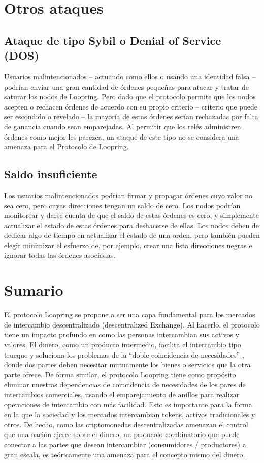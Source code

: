 \documentclass[UTF8,nofonts]{article}
\begin{document}
\begin{multicols}{2}
\section{Otros ataques}
\subsection{Ataque de tipo Sybil o Denial of Service (DOS)}
Usuarios malintencionados -- actuando como ellos o usando una identidad falsa -- podr\'ian enviar una gran cantidad de \'ordenes peque\~nas para atacar y tratar de saturar los nodos de Loopring. Pero dado que el protocolo permite que los nodos acepten o rechacen \'ordenes de acuerdo con su propio criterio -- criterio que puede ser escondido o revelado -- la mayor\'ia de estas \'ordenes ser\'ian rechazadas por falta de ganancia cuando sean emparejadas. Al permitir que los rel\'es administren \'ordenes como mejor les parezca, un ataque de este tipo no se considera una amenaza para el Protocolo de Loopring.

\subsection{Saldo insuficiente}
Los usuarios malintencionados podr\'ian firmar y propagar \'ordenes cuyo valor no sea cero, pero cuyas direcciones tengan un saldo de cero. Los nodos podr\'ian monitorear y darse cuenta de que el saldo de estas \'ordenes es cero, y simplemente actualizar el estado de estas \'ordenes para deshacerse de ellas. Los nodos deben de dedicar algo de tiempo en actualizar el estado de una orden, pero tambi\'en pueden elegir minimizar el esfuerzo de, por ejemplo, crear una lista direcciones negras e ignorar todas las \'ordenes asociadas.

\section{Sumario}
El protocolo Loopring se propone a ser una capa fundamental para los mercados de intercambio descentralizado (descentralized Exchange). Al hacerlo, el protocolo tiene un impacto profundo en como las personas intercambian sus activos y valores. El dinero, como un producto intermedio, facilita el intercambio tipo trueque y soluciona los problemas de la \enquote{doble coincidencia de necesidades} \cite{unenumerated2006}, donde dos partes deben necesitar mutuamente los bienes o servicios que la otra parte ofrece. De forma similar, el protocolo Loopring tiene como prop\'osito eliminar nuestras dependencias de coincidencia de necesidades de los pares de intercambios comerciales, usando el emparejamiento de anillos para realizar operaciones de intercambio con m\'as facilidad. Esto es importante para la forma en la que la sociedad y los mercados intercambian tokens, activos tradicionales y otros. De hecho, como las criptomonedas descentralizadas amenazan el control que una naci\'on ejerce sobre el dinero, un protocolo combinatorio que puede conectar a las partes que desean intercambiar (consumidores / productores) a gran escala, es te\'oricamente una amenaza para el concepto mismo del dinero.


\end{multicols}
\end{document}
